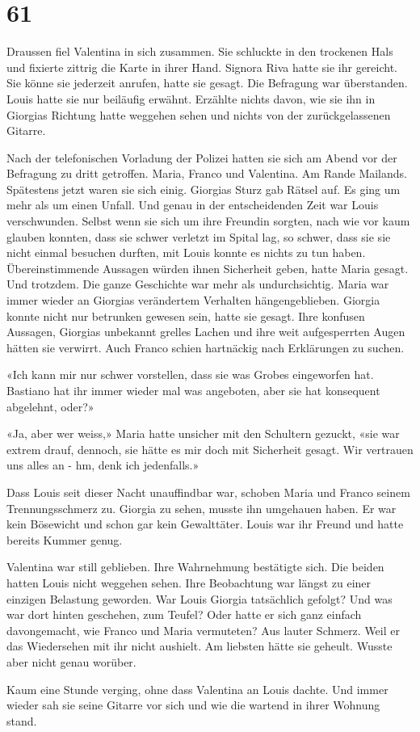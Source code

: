 \chapter{61}



Draussen fiel Valentina in sich zusammen. Sie schluckte in den trockenen Hals und fixierte zittrig die Karte in ihrer Hand. Signora
Riva hatte sie ihr gereicht. Sie könne sie jederzeit anrufen, hatte sie
gesagt.
Die Befragung war überstanden. Louis hatte sie nur beiläufig erwähnt.
Erzählte nichts davon, wie sie ihn in Giorgias Richtung hatte
weggehen sehen und nichts von der zurückgelassenen Gitarre.

\sectionbreak

Nach der telefonischen Vorladung der Polizei hatten sie sich am Abend
vor der Befragung zu dritt getroffen. Maria, Franco und Valentina. Am Rande Mailands. Spätestens
jetzt waren sie sich einig. Giorgias Sturz gab Rätsel auf.
Es ging um mehr als um einen Unfall.
Und genau in der entscheidenden Zeit war Louis verschwunden. Selbst wenn
sie sich um ihre Freundin sorgten, nach wie vor kaum glauben konnten, dass sie
schwer verletzt im Spital lag, so schwer, dass sie sie nicht einmal
besuchen durften, mit Louis konnte es nichts zu tun haben.
Übereinstimmende Aussagen würden ihnen Sicherheit geben, hatte Maria
gesagt.
Und trotzdem. Die ganze Geschichte war mehr als undurchsichtig.
Maria war immer wieder an Giorgias verändertem Verhalten
hängengeblieben. Giorgia konnte nicht nur betrunken gewesen sein, hatte sie gesagt. Ihre
konfusen Aussagen, Giorgias unbekannt grelles Lachen und ihre weit
aufgesperrten Augen hätten sie verwirrt.
Auch Franco schien hartnäckig nach Erklärungen zu suchen.

«Ich kann mir nur schwer vorstellen, dass sie was Grobes eingeworfen
hat. Bastiano hat ihr immer wieder mal was angeboten, aber sie hat
konsequent abgelehnt, oder?»

«Ja, aber wer weiss,» Maria hatte unsicher mit den Schultern gezuckt, «sie war extrem
drauf, dennoch, sie hätte es mir doch mit Sicherheit gesagt. Wir vertrauen
uns alles an - hm, denk ich jedenfalls.» 

Dass Louis seit dieser Nacht unauffindbar war, schoben Maria und Franco
seinem Trennungsschmerz zu. Giorgia zu sehen, musste ihn umgehauen
haben. Er war kein Bösewicht und schon gar kein Gewalttäter. Louis
war ihr Freund und hatte bereits Kummer genug.

Valentina war still geblieben. Ihre Wahrnehmung bestätigte sich. Die
beiden hatten Louis nicht weggehen sehen. Ihre Beobachtung war längst zu einer einzigen Belastung geworden. 
War Louis Giorgia tatsächlich gefolgt? Und was war dort hinten
geschehen, zum Teufel? Oder hatte er sich ganz einfach davongemacht, wie
Franco und Maria vermuteten? Aus lauter Schmerz. Weil er das Wiedersehen
mit ihr nicht aushielt. Am liebsten hätte sie geheult. Wusste aber nicht genau worüber.

Kaum eine Stunde verging, ohne dass Valentina an Louis dachte. Und immer wieder sah sie seine Gitarre vor sich und wie die wartend in ihrer Wohnung stand.

